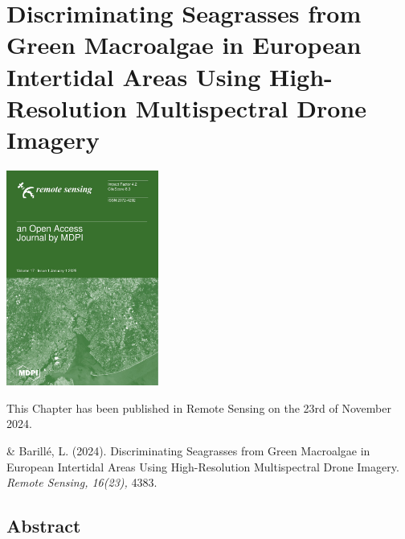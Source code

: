 \documentclass[
  letterpaper,
  11pt,
  english,
  singlespacing,
  headsepline]{MastersDoctoralThesis}
\newcommand{\chaptertopimage}{Chapter1/img/seagrasses.png}
\newcommand{\chapterbottomimage}{Chapter1/img/seagrasses.png}
\begin{document}
\renewcommand{\chaptertopimage}{Chapter3/img/top.png}
\renewcommand{\chapterbottomimage}{Chapter3/img/bottom.png}

\newpage\null\thispagestyle{empty}\newpage


\chapter{Discriminating Seagrasses from Green Macroalgae in European
Intertidal Areas Using High-Resolution Multispectral Drone
Imagery}\label{discriminating-seagrasses-from-green-macroalgae-in-european-intertidal-areas-using-high-resolution-multispectral-drone-imagery}

\begin{center} 
\includegraphics[width=5cm]{LogoRS.jpg}
\end{center}

This Chapter has been published in Remote Sensing on the 23rd of November 2024.

\vspace{0.5cm}

\noindent
{}
\hspace*{2em}\begin{minipage}{0.9\textwidth}
\& Barillé, L. (2024). Discriminating Seagrasses from Green Macroalgae in European Intertidal Areas Using High-Resolution Multispectral Drone Imagery.
\textit{Remote Sensing, 16(23),} 4383.
\end{minipage}

\section*{Abstract}\label{abstract-1}
\end{document}
